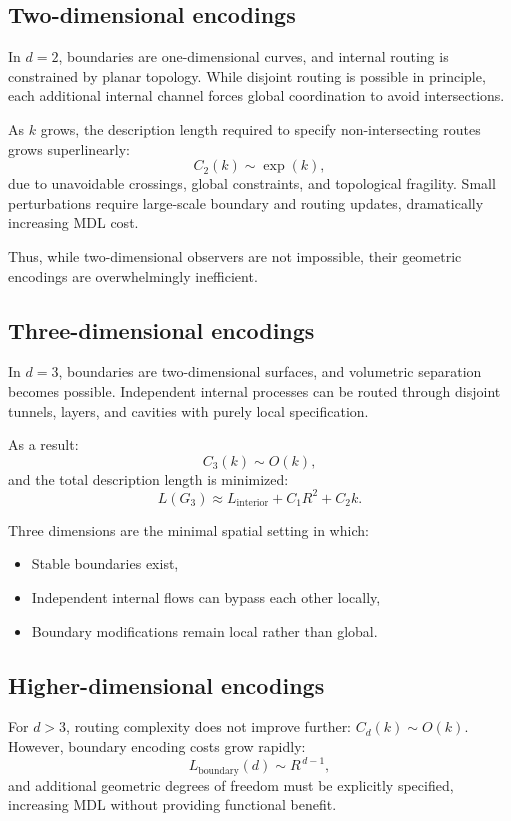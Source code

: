 \documentclass[11pt]{article}
\begin{document}
\subsection{Two-dimensional encodings}

In $d=2$, boundaries are one-dimensional curves, and internal routing is constrained by planar topology. While disjoint routing is possible in principle, each additional internal channel forces global coordination to avoid intersections.

As $k$ grows, the description length required to specify non-intersecting routes grows superlinearly:
\[
C_2(k) \sim \exp(k),
\]
due to unavoidable crossings, global constraints, and topological fragility. Small perturbations require large-scale boundary and routing updates, dramatically increasing MDL cost.

Thus, while two-dimensional observers are not impossible, their geometric encodings are overwhelmingly inefficient.

\subsection{Three-dimensional encodings}

In $d=3$, boundaries are two-dimensional surfaces, and volumetric separation becomes possible. Independent internal processes can be routed through disjoint tunnels, layers, and cavities with purely local specification.

As a result:
\[
C_3(k) \sim O(k),
\]
and the total description length is minimized:
\[
L(G_3) \approx L_{\text{interior}} + C_1 R^2 + C_2 k.
\]

Three dimensions are the minimal spatial setting in which:
\begin{itemize}
    \item Stable boundaries exist,
    \item Independent internal flows can bypass each other locally,
    \item Boundary modifications remain local rather than global.
\end{itemize}

\subsection{Higher-dimensional encodings}

For $d>3$, routing complexity does not improve further: $C_d(k) \sim O(k)$. However, boundary encoding costs grow rapidly:
\[
L_{\text{boundary}}(d) \sim R^{\,d-1},
\]
and additional geometric degrees of freedom must be explicitly specified, increasing MDL without providing functional benefit.
\end{document}
